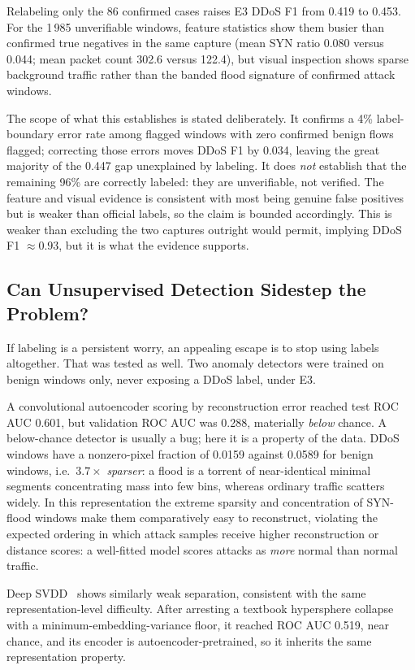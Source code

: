 \documentclass[conference]{IEEEtran} \IEEEoverridecommandlockouts
\begin{document}
Relabeling only the 86 confirmed cases raises E3 DDoS F1 from 0.419 to 0.453.
For the 1\,985 unverifiable windows, feature statistics show them busier than
confirmed true negatives in the same capture (mean SYN ratio 0.080 versus
0.044; mean packet count 302.6 versus 122.4), but visual inspection shows
sparse background traffic rather than the banded flood signature of confirmed
attack windows.

The scope of what this establishes is stated deliberately. It confirms a 4\%
label-boundary error rate among flagged windows with zero confirmed benign
flows flagged; correcting those errors moves DDoS F1 by 0.034, leaving the great
majority of the 0.447 gap unexplained by labeling. It does \emph{not} establish
that the remaining 96\% are correctly labeled: they are unverifiable, not
verified. The feature and visual evidence is consistent with most being genuine
false positives but is weaker than official labels, so the claim is bounded
accordingly. This is weaker than excluding the two captures outright would
permit, implying DDoS F1 $\approx 0.93$, but it is what the evidence
supports.

\subsection{Can Unsupervised Detection Sidestep the Problem?} \label{sec:unsup}
If labeling is a persistent worry, an appealing escape is to stop using labels
altogether. That was tested as well. Two anomaly detectors were trained on
benign windows only, never exposing a DDoS label, under E3.

A convolutional autoencoder scoring by reconstruction error reached test ROC
AUC 0.601, but validation ROC AUC was 0.288, materially \emph{below} chance. A
below-chance detector is usually a bug; here it is a property of the data. DDoS
windows have a nonzero-pixel fraction of 0.0159 against 0.0589 for benign
windows, i.e.\ $3.7\times$ \emph{sparser}: a flood is a torrent of
near-identical minimal segments concentrating mass into few bins, whereas
ordinary traffic scatters widely. In this representation the
extreme sparsity and concentration of SYN-flood windows make them comparatively
easy to reconstruct, violating the expected ordering in which attack samples
receive higher reconstruction or distance scores: a well-fitted model scores
attacks as \emph{more} normal than normal traffic.

Deep SVDD~\cite{ruff2018deep} shows similarly weak separation, consistent with
the same representation-level difficulty. After arresting a textbook
hypersphere collapse with a minimum-embedding-variance floor, it reached ROC
AUC 0.519, near chance, and its encoder is autoencoder-pretrained, so it
inherits the same representation property.
\end{document}
